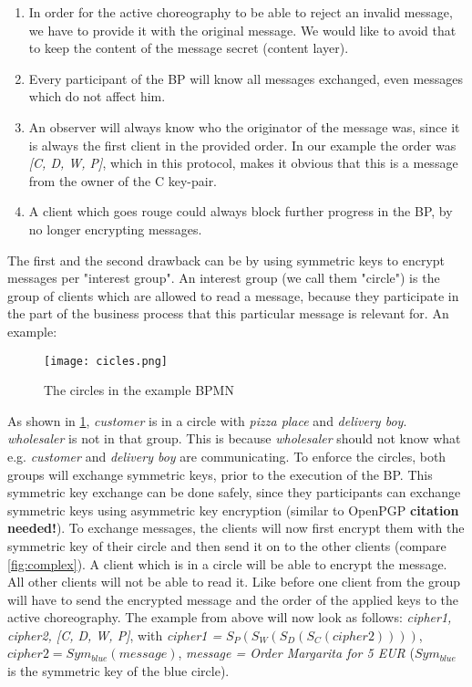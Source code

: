 \documentclass[runningheads]{llncs}
\begin{document}
\begin{enumerate}
    \item In order for the active choreography to be able to reject an invalid message, we have to provide it with the original message. We would like to avoid that to keep the content of the message secret (content layer).
    \item Every participant of the BP will know all messages exchanged, even messages which do not affect him. 
    \item An observer will always know who the originator of the message was, since it is always the first client in the provided order. In our example the order was \textit{[C, D, W, P]}, which in this protocol, makes it obvious that this is a message from the owner of the C key-pair.
    \item A client which goes rouge could always block further progress in the BP, by no longer encrypting messages.
\end{enumerate}

The first and the second drawback can be by using symmetric keys to encrypt messages per "interest group". An interest group (we call them "circle") is the group of clients which are allowed to read a message, because they participate in the part of the business process that this particular message is relevant for. An example: 

\begin{figure}
    \centering
    \texttt{[image: cicles.png]}
    \caption{The circles in the example BPMN}
    \label{fig:circle}
\end{figure}


As shown in \ref{fig:circle}, \textit{customer} is in a circle with \textit{pizza place} and \textit{delivery boy}. \textit{wholesaler} is not in that group. This is because \textit{wholesaler} should not know what e.g. \textit{customer} and \textit{delivery boy} are communicating. To enforce the circles, both groups will exchange symmetric keys, prior to the execution of the BP. This symmetric key exchange can be done safely, since they participants can exchange symmetric keys using asymmetric key encryption (similar to OpenPGP  \textbf{citation needed!}). To exchange messages, the clients will now first encrypt them with the symmetric key of their circle and then send it on to the other clients (compare \ref{fig:complex}). A client which is in a circle will be able to encrypt the message. All other clients will not be able to read it. Like before one client from the group will have to send the encrypted message and the order of the applied keys to the active choreography. The example from above will now look as follows: \textit{cipher1, cipher2, [C, D, W, P]}, with \textit{cipher1 =} $S_P(S_W(S_D(S_C(cipher2))))$, $cipher2 = Sym_{blue}(message)$, \textit{message = Order Margarita for 5 EUR} ($Sym_{blue}$ is the symmetric key of the blue circle).
\end{document}
